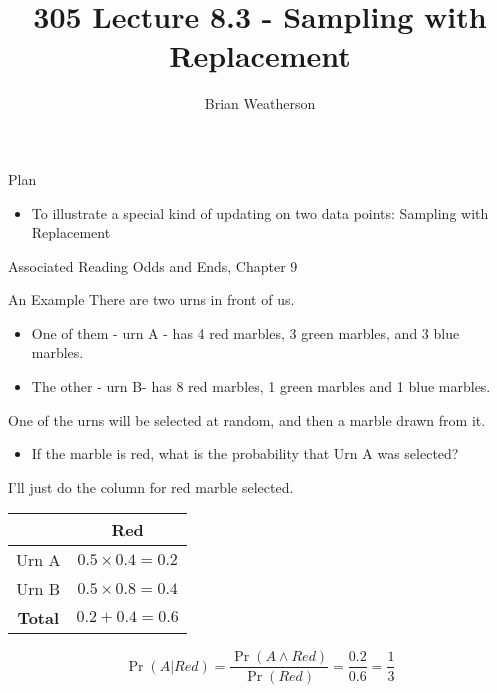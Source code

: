 \documentclass[
  ignorenonframetext,
]{beamer}
\title{305 Lecture 8.3 - Sampling with Replacement}
\author{Brian Weatherson}
\date{}
\providecommand{\tightlist}{%
  \setlength{\itemsep}{0pt}\setlength{\parskip}{0pt}}
\renewcommand{\,}{\text{, }}
\begin{document}
\frame{\titlepage}

\begin{frame}{Plan}
\protect\hypertarget{plan}{}
\begin{itemize}
\tightlist
\item
  To illustrate a special kind of updating on two data points: Sampling
  with Replacement
\end{itemize}
\end{frame}

\begin{frame}{Associated Reading}
\protect\hypertarget{associated-reading}{}
Odds and Ends, Chapter 9
\end{frame}

\begin{frame}{An Example}
\protect\hypertarget{an-example}{}
There are two urns in front of us.

\begin{itemize}
\tightlist
\item
  One of them - urn A - has 4 red marbles, 3 green marbles, and 3 blue
  marbles.
\item
  The other - urn B- has 8 red marbles, 1 green marbles and 1 blue
  marbles. \pause
\end{itemize}

One of the urns will be selected at random, and then a marble drawn from
it.

\begin{itemize}
\tightlist
\item
  If the marble is red, what is the probability that Urn A was selected?
\end{itemize}
\end{frame}

\begin{frame}
I'll just do the column for red marble selected.

\begin{longtable}[]{@{}cc@{}}
\toprule
& Red \\
\midrule
\endhead
Urn A & \(0.5 \times 0.4 = 0.2\) \\
Urn B & \(0.5 \times 0.8 = 0.4\) \\
\textbf{Total} & \(0.2 + 0.4 = 0.6\) \\
\bottomrule
\end{longtable}

\[
\Pr(A | Red) = \frac{\Pr(A \wedge Red)}{\Pr(Red)} = \frac{0.2}{0.6} = \frac{1}{3}
\]
\end{frame}
\end{document}
